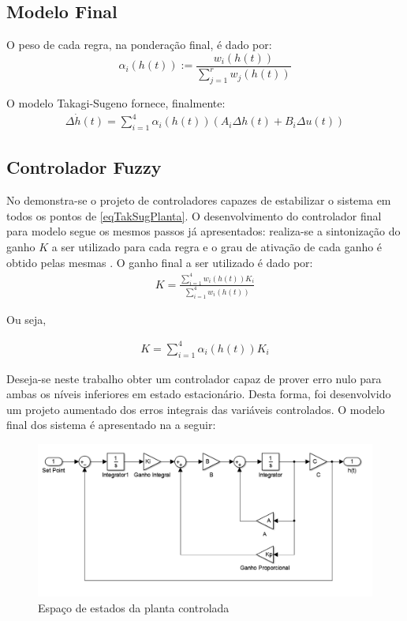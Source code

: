 \subsection{Modelo Final}
O peso de cada regra, na ponderação final, é dado por:
\begin{equation*}
	\alpha_i (h(t)) := \frac{w_i(h(t))}{\sum_{j=1}^{r}w_j(h(t))}
\end{equation*}

O modelo Takagi-Sugeno fornece, finalmente:
	\begin{align} \label{eqTakSugPlanta}
		\Delta \dot{h}(t) = \sum_{i=1}^{4} \alpha_i (h(t))(A_i \Delta h(t) +  B_i \Delta u(t))
	\end{align}


\subsection{Controlador Fuzzy}
No  demonstra-se o projeto de controladores capazes de estabilizar o sistema em todos os pontos de \ref{eqTakSugPlanta}. O desenvolvimento do controlador final para modelo segue os mesmos passos já apresentados: realiza-se a sintonização do ganho $K$ a ser utilizado para cada regra e o grau de ativação de cada ganho é obtido pelas mesmas .
 O ganho final a ser utilizado é dado por:
	\begin{align*}
		K = \frac{\sum_{i=1}^{4}  w_i(h(t))K_i}{\sum_{i=1}^{4} w_i(h(t))}
	\end{align*}
	
Ou seja,

\begin{align} \label{eqModContFuzzy}
K = \sum_{i=1}^{4}  \alpha_i (h(t)) K_i
\end{align}

Deseja-se neste trabalho obter um controlador capaz de prover erro nulo para ambas os níveis inferiores em estado estacionário. Desta forma, foi desenvolvido um projeto aumentado dos erros integrais das variáveis controlados. O modelo final dos sistema é apresentado na  a seguir:

\begin{figure}[H]
	\begin{centering}
		\includegraphics[width=\textwidth]{img/modelo_controlado.png}
		\par\end{centering}
	\caption{\label{figSimPlantCtrl}Espaço de estados da planta controlada}
\end{figure}

%


